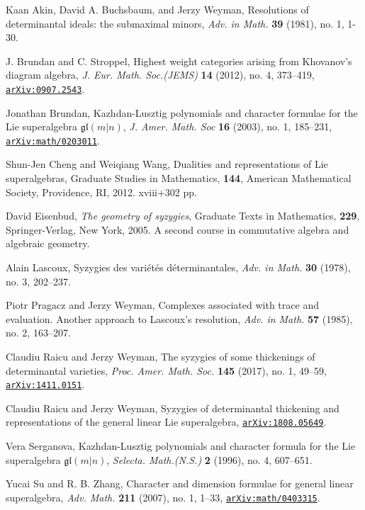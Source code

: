 \documentclass[12pt]{amsart}
\theoremstyle{definition}
\theoremstyle{remark}
\newcommand{\gl}{\mathfrak{gl}}
\numberwithin{equation}{section}
\newcommand{\arxiv}[1]{\href{http://arxiv.org/abs/#1}{{\tt arXiv:#1}}}
\begin{document}
\begin{thebibliography}{SSam1}

 Kaan Akin, David A. Buchsbaum, and Jerzy Weyman, Resolutions of determinantal ideals: the submaximal minors, {\it Adv. in Math.} {\bf 39} (1981), no. 1, 1-30.

 J. Brundan and C. Stroppel, Highest weight categories arising from Khovanov's diagram algebra, {\it J. Eur. Math. Soc.(JEMS)} {\bf 14} (2012), no. 4, 373--419, \arxiv{0907.2543}.

 Jonathan Brundan, Kazhdan-Lusztig polynomials and character formulae for the Lie superalgebra $\gl(m|n)$, {\it J. Amer. Math. Soc} {\bf 16} (2003), no. 1, 185--231, \arxiv{math/0203011}.

 Shun-Jen Cheng and Weiqiang Wang, Dualities and representations of Lie superalgebras, Graduate Studies in Mathematics, {\bf 144}, American Mathematical Society, Providence, RI, 2012. xviii+302 pp.

 David Eisenbud, {\it The geometry of syzygies}, Graduate Texts in Mathematics, {\bf 229}, Springer-Verlag, New York, 2005. A second course in commutative algebra and algebraic geometry.
  
 Alain Lascoux, Syzygies des vari\'et\'es d\'eterminantales, {\it Adv. in Math.} {\bf 30} (1978), no. 3, 202--237.

 Piotr Pragacz and Jerzy Weyman, Complexes associated with trace and evaluation. Another approach to Lascoux's resolution, {\it Adv. in Math.} {\bf 57} (1985), no. 2, 163--207.

 Claudiu Raicu and Jerzy Weyman, The syzygies of some thickenings of determinantal varieties, {\it Proc. Amer. Math. Soc.} {\bf 145} (2017), no. 1, 49--59, \arxiv{1411.0151}.

 Claudiu Raicu and Jerzy Weyman, Syzygies of determinantal thickening and representations of the general linear Lie superalgebra, \arxiv{1808.05649}. %

 Vera Serganova, Kazhdan-Lusztig polynomials and character formula for the Lie superalgebra $\gl(m|n)$, {\it Selecta. Math.(N.S.)} {\bf 2} (1996), no. 4, 607--651.

 Yucai Su and R. B. Zhang, Character and dimension formulae for general linear superalgebra, {\it Adv. Math.} {\bf 211} (2007), no. 1, 1--33, \arxiv{math/0403315}.


\end{thebibliography}
\end{document}

